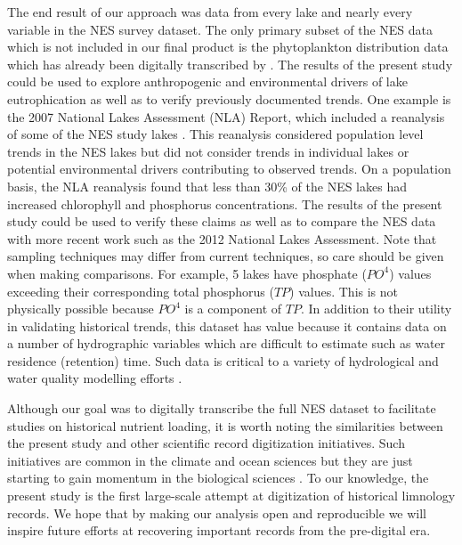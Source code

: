 \documentclass[journal abbreviations, manuscript]{copernicus}
\begin{document}
The end result of our approach was data from every lake and nearly every variable in the NES survey dataset. The only primary subset of the NES data which is not included in our final product is the phytoplankton distribution data which has already been digitally transcribed by \citet{stomp2011large}. The results of the present study could be used to explore anthropogenic and environmental drivers of lake eutrophication as well as to verify previously documented trends. One example is the 2007 National Lakes Assessment (NLA) Report, which included a reanalysis of some of the NES study lakes \citep{nla-methods}. This reanalysis considered population level trends in the NES lakes but did not consider trends in individual lakes or potential environmental drivers contributing to observed trends. On a population basis, the NLA reanalysis found that less than 30\% of the NES lakes had increased chlorophyll and phosphorus concentrations. The results of the present study could be used to verify these claims as well as to compare the NES data with more recent work such as the 2012 National Lakes Assessment.  Note that sampling techniques may differ from current techniques, so care should be given when making comparisons. For example, 5 lakes have phosphate ($PO^4$) values exceeding their corresponding total phosphorus ($TP$) values. This is not physically possible because $PO^4$ is a component of $TP$. In addition to their utility in validating historical trends, this dataset has value because it contains data on a number of hydrographic variables which are difficult to estimate such as water residence (retention) time. Such data is critical to a variety of hydrological and water quality modelling efforts \citep{Brettreviewreassessmentlake2007}. 

Although our goal was to digitally transcribe the full NES dataset to facilitate studies on historical nutrient loading, it is worth noting the similarities between the present study and other scientific record digitization initiatives. Such initiatives are common in the climate and ocean sciences but they are just starting to gain momentum in the biological sciences \citep{allan2011international, freeman2017icoads}. To our knowledge, the present study is the first large-scale attempt at digitization of historical limnology records. We hope that by making our analysis open and reproducible we will inspire future efforts at recovering important records from the pre-digital era.

\end{document}

